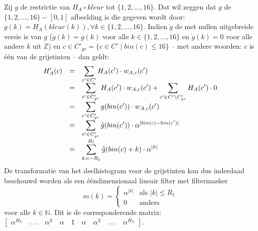 Zij $g$ de restrictie van $H_A \circ kleur$ tot
$\{1,2,\ldots,16\}$. Dat wil zeggen dat $g$ de $\{1,2,\ldots,16\} - [0,1]$ afbeelding is die 
gegeven wordt door:
$g(k)=H_A(kleur(k)), \forall k \in \{1,2,\ldots,16\}$.
Indien $\mathring{g}$ de met nullen uitgebreide versie is van $g$ ($\mathring{g}(k)=g(k)$ voor
alle $k \in \{1,2,\ldots,16\}$ en $\mathring{g}(k)=0$ voor alle andere $k$ uit $\mathbb{Z}$)
en $c \in C'_{gr}=\{c \in C' \mid bin(c) \le 16\}$ -- met
andere woorden: $c$ is \'e\'en van de grijstinten -- dan geldt:
$$
\begin{array}{r@{\quad=\quad}l}
H'_A(c) & \displaystyle\sum_{c' \in C'} H_A(c') \cdot w_{A,c}(c') \\[2pt]
 & \displaystyle\sum_{c' \in C'_{gr}} H_A(c') \cdot w_{A,c}(c') + \sum_{c' \in C' \setminus C'_{gr}} H_A(c') \cdot 0 \\[2pt]
 & \displaystyle\sum_{c' \in C'_{gr}} g(bin(c')) \cdot w_{A,c}(c') \\[2pt]
 & \displaystyle\sum_{c' \in C'_{gr}} \mathring{g}(bin(c')) \cdot \alpha^{|bin(c)-bin(c')|} \\[2pt]
 & \displaystyle\sum_{k=-R_1}^{R_1} \mathring{g}(bin(c)+k) \cdot \alpha^{|k|}
\end{array}
$$
De transformatie van het deelhistogram voor de grijstinten kan dus inderdaad beschouwd worden
als een \'e\'endimensionaal lineair filter met filtermasker 
$$
m(k)= \left\{ 
\begin{array}{ll} 
\alpha^{|k|} & \textrm{als } |k| \le R_1 \\ 
0 & \textrm{anders} 
\end{array} \right.
$$
voor alle $k \in \mathbb{N}$. Dit is de corresponderende matrix: 
$
\left[ \begin{array}{l@{\quad\ldots\quad}lllll@{\quad\ldots\quad}l} \alpha^{R_1} & \alpha^{2} & \alpha & 1 & \alpha & \alpha^{2} & \alpha^{R_1} \end{array} \right]
$.

